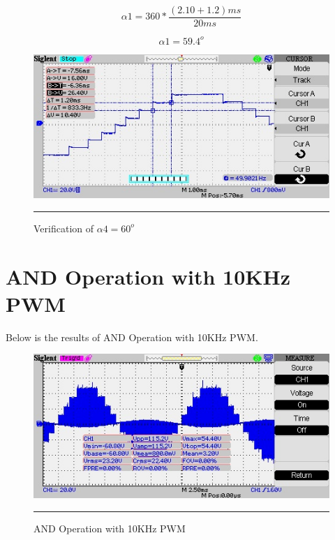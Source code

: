 \begin{equation}
\alpha1 = 360*\frac{(2.10 + 1.2)ms}{20ms}
\end{equation}

\begin{equation}
\alpha1 = 59.4^o
\end{equation}

\begin{figure}[htbp]
	\centering
	\includegraphics[width = 6in]{./Figures/Photos/Hardware/26}
	\rule{35em}{1pt}
	\caption{Verification of $\alpha4 = 60^o$}
\end{figure}
\newpage
\section{AND Operation with 10KHz PWM}
Below is the results of AND Operation with 10KHz PWM.
\begin{figure}[htbp]
	\centering
	\includegraphics[width = 6in]{./Figures/Photos/Hardware/32}
	\rule{35em}{1pt}
	\caption{AND Operation with 10KHz PWM}
\end{figure}
\newpage
